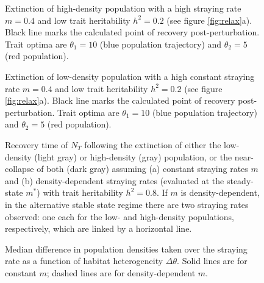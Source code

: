\documentclass{revtex4}
\begin{document}
\begin{figure}
  \captionsetup{justification=raggedright,
singlelinecheck=false
}
\centering
\caption{
Extinction of high-density population with a high straying rate $m=0.4$ and low trait heritability $h^2=0.2$ (see figure \ref{fig:relax}a).
Black line marks the calculated point of recovery post-perturbation.
Trait optima are $\theta_1 = 10$ (blue population trajectory) and $\theta_2 = 5$ (red population).
} \label{fig:relaxtraj_hdlh}
\end{figure}


\begin{figure}
  \captionsetup{justification=raggedright,
singlelinecheck=false
}
\centering
\caption{
Extinction of low-density population with a high constant straying rate $m=0.4$ and low trait heritability $h^2=0.2$ (see figure \ref{fig:relax}a).
Black line marks the calculated point of recovery post-perturbation.
Trait optima are $\theta_1 = 10$ (blue population trajectory) and $\theta_2 = 5$ (red population).
} \label{fig:relaxtraj_ldlh}
\end{figure}



\begin{figure}
  \captionsetup{justification=raggedright,
singlelinecheck=false
}
\centering
\caption{
Recovery time of $N_T$ following the extinction of either the low-density (light gray) or high-density (gray) population, or the near-collapse of both (dark gray) assuming (a) constant straying rates $m$ and (b) density-dependent straying rates (evaluated at the steady-state $m^*$) with trait heritability $h^2=0.8$.
If $m$ is density-dependent, in the alternative stable state regime there are two straying rates observed: one each for the low- and high-density populations, respectively, which are linked by a horizontal line.
} \label{fig:relax_highh}
\end{figure}

\clearpage


\begin{figure}
  \captionsetup{justification=raggedright,
singlelinecheck=false
}
\centering
\caption{
Median difference in population densities taken over the straying rate as a function of habitat heterogeneity $\Delta\theta$.
Solid lines are for constant $m$; dashed lines are for density-dependent $m$.} \label{fig:thetadiffN}
\end{figure}
\end{document}

